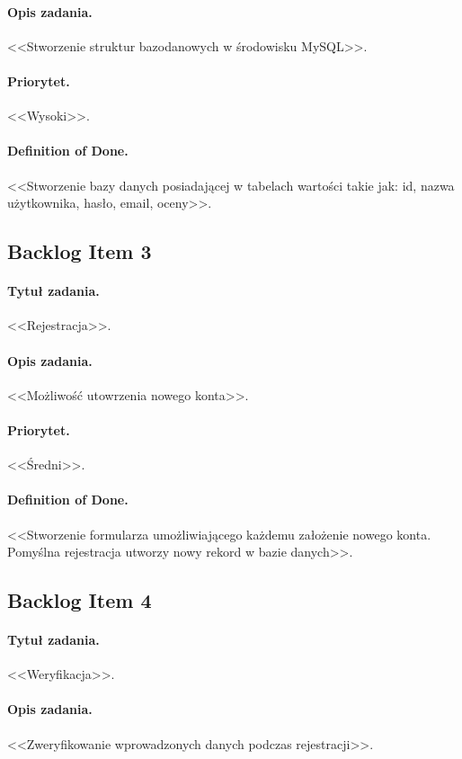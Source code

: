 \documentclass[a4paper]{article}
\begin{document}
\paragraph{Opis zadania.} <<Stworzenie struktur bazodanowych w środowisku MySQL>>.
\paragraph{Priorytet.} <<Wysoki>>.
\paragraph{Definition of Done.} <<Stworzenie bazy danych posiadającej w tabelach wartości takie jak: id, nazwa użytkownika, hasło, email, oceny>>.

\subsection{Backlog Item 3}
\paragraph{Tytuł zadania.} <<Rejestracja>>.
\paragraph{Opis zadania.} <<Możliwość utowrzenia nowego konta>>.
\paragraph{Priorytet.} <<Średni>>.
\paragraph{Definition of Done.} <<Stworzenie formularza umożliwiającego każdemu założenie nowego konta. Pomyślna rejestracja utworzy nowy rekord w bazie danych>>.

\subsection{Backlog Item 4}
\paragraph{Tytuł zadania.} <<Weryfikacja>>.
\paragraph{Opis zadania.} <<Zweryfikowanie wprowadzonych danych podczas rejestracji>>.
\end{document}
